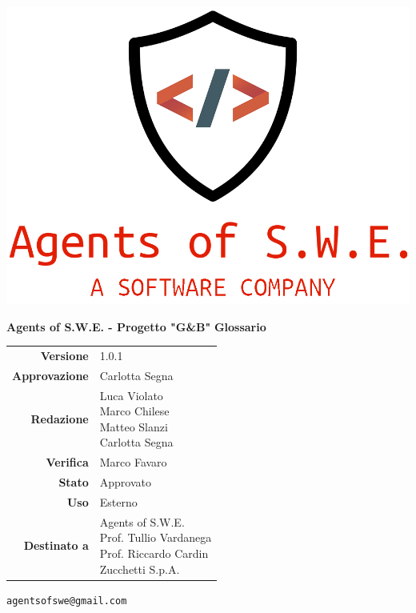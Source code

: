 


\begin{titlepage}
\thispagestyle{empty}

\begin{center}

\includegraphics[scale=0.3]{./images/logo.png} 

\large \textbf{Agents of S.W.E. - Progetto "G\&B"}
\vfill
\Huge \textbf{Glossario}
\vfill
\large
\renewcommand{\arraystretch}{1.3}
\begin{tabular}{r|l}
\textbf{Versione} & 1.0.1\\
\textbf{Approvazione} & Carlotta Segna\\
\textbf{Redazione} & \parbox[t]{5cm}{Luca Violato\\Marco Chilese\\Matteo Slanzi\\Carlotta Segna}\\
\textbf{Verifica} & \parbox[t]{5cm}{Marco Favaro}\\
\textbf{Stato} & Approvato \\
\textbf{Uso} & Esterno\\
\textbf{Destinato a} & \parbox[t]{5cm}{Agents of S.W.E. \\Prof. Tullio Vardanega\\Prof. Riccardo Cardin\\ Zucchetti S.p.A.}
\end{tabular}
\vfill
\small
\texttt{agentsofswe@gmail.com}
\end{center}
\end{titlepage}

